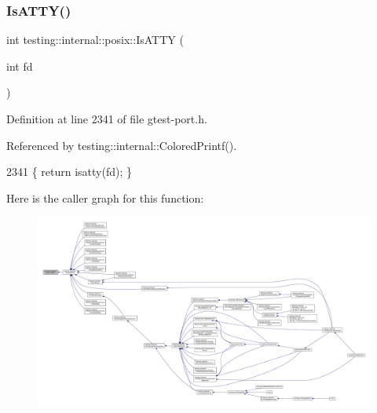 \mbox{\label{namespacetesting_1_1internal_1_1posix_a16ebe936b3a8ea462a94191635aedc27}} 
\subsubsection{\texorpdfstring{Is\+A\+T\+T\+Y()}{IsATTY()}}
{\footnotesize\ttfamily int testing\+::internal\+::posix\+::\+Is\+A\+T\+TY (\begin{DoxyParamCaption}\item[{int}]{fd }\end{DoxyParamCaption})\hspace{0.3cm}{\ttfamily [inline]}}



Definition at line 2341 of file gtest-\/port.\+h.



Referenced by testing\+::internal\+::\+Colored\+Printf().


\begin{DoxyCode}
2341 \{ \textcolor{keywordflow}{return} isatty(fd); \}
\end{DoxyCode}
Here is the caller graph for this function\+:
\nopagebreak
\begin{figure}[H]
\begin{center}
\leavevmode
\includegraphics[width=350pt]{namespacetesting_1_1internal_1_1posix_a16ebe936b3a8ea462a94191635aedc27_icgraph}
\end{center}
\end{figure}
\mbox{\label{namespacetesting_1_1internal_1_1posix_af0d04ed5baeed28353fa38742748a421}} 
